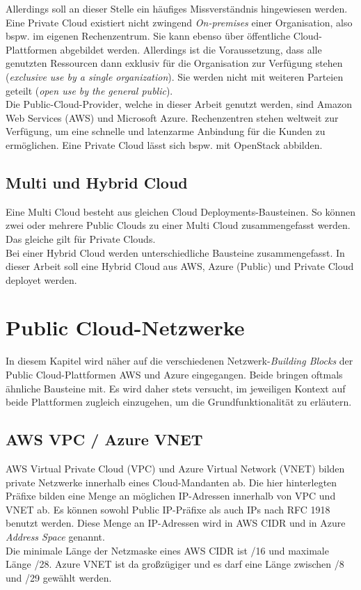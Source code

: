 Allerdings soll an dieser Stelle ein häufiges Missverständnis hingewiesen werden. Eine Private Cloud existiert nicht zwingend \textit{On-premises} einer Organisation, also bspw. im eigenen Rechenzentrum. Sie kann ebenso über öffentliche Cloud-Plattformen abgebildet werden. Allerdings ist die Voraussetzung, dass alle genutzten Ressourcen dann exklusiv für die Organisation zur Verfügung stehen (\textit{exclusive use by a single organization}). Sie werden nicht mit weiteren Parteien geteilt (\textit{open use by the general public}).\\
Die Public-Cloud-Provider, welche in dieser Arbeit genutzt werden, sind Amazon Web Services (AWS) und Microsoft Azure. Rechenzentren stehen weltweit zur Verfügung, um eine schnelle und latenzarme Anbindung für die Kunden zu ermöglichen. Eine Private Cloud lässt sich bspw. mit OpenStack abbilden.

\subsection{Multi und Hybrid Cloud}
Eine Multi Cloud besteht aus gleichen Cloud Deployments-Bausteinen. So können zwei oder mehrere Public Clouds zu einer Multi Cloud zusammengefasst werden. Das gleiche gilt für Private Clouds.\\
Bei einer Hybrid Cloud werden unterschiedliche Bausteine zusammengefasst. In dieser Arbeit soll eine Hybrid Cloud aus AWS, Azure (Public) und Private Cloud deployet werden.

\section{Public Cloud-Netzwerke}\label{cloud}
In diesem Kapitel wird näher auf die verschiedenen Netzwerk-\textit{Building Blocks} der Public Cloud-Plattformen AWS und Azure eingegangen. Beide bringen oftmals ähnliche Bausteine mit. Es wird daher stets versucht, im jeweiligen Kontext auf beide Plattformen zugleich einzugehen, um die Grundfunktionalität zu erläutern. %

\subsection{AWS VPC / Azure VNET}
AWS Virtual Private Cloud (VPC) und Azure Virtual Network (VNET) bilden private Netzwerke innerhalb eines Cloud-Mandanten ab. Die hier hinterlegten Präfixe bilden eine Menge an möglichen IP-Adressen innerhalb von VPC und VNET ab. Es können sowohl Public IP-Präfixe als auch IPs nach RFC 1918 benutzt werden. Diese Menge an IP-Adressen wird in AWS {CIDR} und in Azure \textit{Address Space} genannt.\\
Die minimale Länge der Netzmaske eines AWS CIDR ist /16 und maximale Länge /28\cite[S.100]{awsug2020}. Azure VNET ist da großzügiger und es darf eine Länge zwischen /8 und /29 gewählt werden\cite[S.10]{Toroman2019}. 

